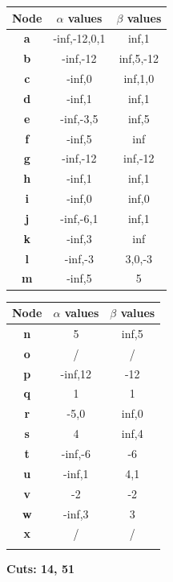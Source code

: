 \documentclass[11pt,a4paper]{report}
\begin{document}
\begin{answers}[8cm]
    \begin{multicols}{2}
    \begin{tabular}{ccc}
    Node & $\alpha$ values & $\beta$ values\\
    \hline
    \textbf{a} &-inf,-12,0,1  &inf,1 \\ 
    \textbf{b} &-inf,-12  &inf,5,-12  \\
    \textbf{c} &-inf,0  &inf,1,0  \\
    \textbf{d} &-inf,1  &inf,1  \\
    \textbf{e} &-inf,-3,5 &inf,5  \\
    \textbf{f} &-inf,5  &inf  \\
    \textbf{g} &-inf,-12  &inf,-12  \\
    \textbf{h} &-inf,1  &inf,1  \\
    \textbf{i} &-inf,0  &inf,0  \\
    \textbf{j} &-inf,-6,1  &inf,1  \\
    \textbf{k} &-inf,3  &inf  \\
    \textbf{l} &-inf,-3  &3,0,-3  \\
    \textbf{m} &-inf,5  &5  \\ 
    \end{tabular}
    
    \begin{tabular}{ccc}
    Node & $\alpha$ values & $\beta$ values\\
    \hline
    \textbf{n} &5  &inf,5  \\
    \textbf{o} &/  &/  \\
    \textbf{p} &-inf,12  &-12  \\
    \textbf{q} &1  &1  \\
    \textbf{r} &-5,0  &inf,0  \\
    \textbf{s} &4  &inf,4  \\
    \textbf{t} &-inf,-6  &-6  \\
    \textbf{u} &-inf,1  &4,1  \\
    \textbf{v} &-2  &-2  \\
    \textbf{w} &-inf,3  &3  \\
    \textbf{x} &/  &/  \\
     &  &  \\
    \end{tabular}
    \end{multicols}
    
\textbf{Cuts: 14, 51} 
\end{answers}
\end{document}
